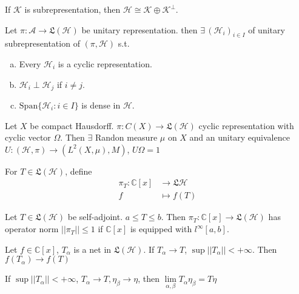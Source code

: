 \begin{fact}
    If  $ \mathcal{K} $ is subrepresentation, then  $ \mathcal{H}\cong \mathcal{K}\oplus \mathcal{K}^\bot  $.    
\end{fact}
\begin{proposition}
    Let  $ \pi:\mathcal{A}\rightarrow\mathfrak{L}(\mathcal{H}) $ be unitary representation. then  $ \exists \, (\mathcal{H}_i)_{i\in I}  $  of unitary subrepresentation of  $ (\pi,\mathcal{H}) $ s.t.
    \begin{enumerate}[(a)]
        \item Every  $ \mathcal{H}_i $ is a cyclic representation.
        \item  $ \mathcal{H}_i\perp \mathcal{H}_j $ if  $ i\not=j $.
        \item  $ \mathrm{Span}\{\mathcal{H}_i:i\in I\} $ is dense in  $ \mathcal{H} $.     
    \end{enumerate} 
\end{proposition}
\begin{theorem}
    Let  $ X  $ be compact Hausdorff.  $ \pi:C(X)\rightarrow\mathfrak{L}(\mathcal{H}) $ cyclic representation with cyclic vector  $ \Omega $. Then  $ \exists $ Randon measure  $ \mu  $ on  $ X  $ and an unitary equivalence  $ U:(\mathcal{H},\pi)\rightarrow (L^2(X,\mu),M) $,  $ U\Omega=1 $ 
\end{theorem}
For  $ T\in \mathfrak{L}(\mathcal{H}) $, define 
\begin{align*}
    \pi_T:\mathbb{C}[x]&\rightarrow \mathfrak{L}\mathcal{H}\\
    f&\mapsto f(T)
\end{align*}
\begin{theorem}
    Let  $ T\in \mathfrak{L}(\mathcal{H}) $ be self-adjoint.  $ a \leq T \leq b $. Then  $ \pi_T:\mathbb{C}[x]\rightarrow\mathfrak{L}(\mathcal{H}) $ has operator norm  $ ||\pi_T|| \leq 1 $ if  $ \mathbb{C}[x] $ is equipped with  $ l^\infty[a,b] $.     
\end{theorem}
\begin{proposition}
    Let  $ f\in \mathbb{C}[x] $,  $ T_\alpha  $ is a net in  $ \mathfrak{L}(\mathcal{H}) $. If  $ T_\alpha\rightarrow T  $,  $ \sup||T_\alpha||<+\infty $. Then  $ f(T_\alpha)\rightarrow f(T) $    
\end{proposition}
\begin{proposition}
    If  $ \sup||T_\alpha||<+\infty $,  $ T_\alpha\rightarrow T,\eta_\beta\rightarrow \eta $, then  $ \lim\limits_{\alpha,\beta}T_\alpha\eta_\beta=T\eta $   
\end{proposition}